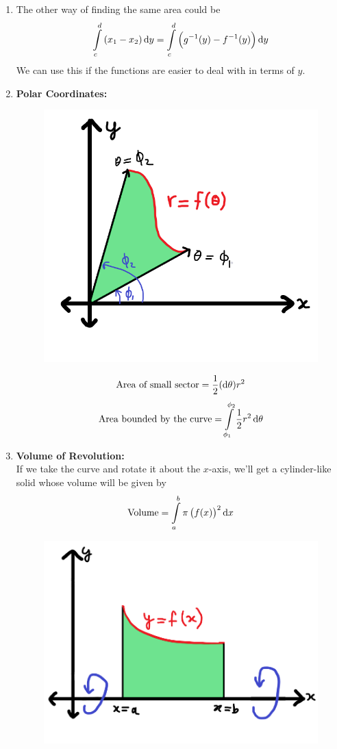 \documentclass[14]{article}
\theoremstyle{definition}
\theoremstyle{case}
\begin{document}
\begin{enumerate}
\begin{figure}[h]
\end{figure}
\item The other way of finding the same area could be
\[\int\limits_c^d \left( x_1 - x_2 \right) \dif y = \int\limits_c^d \left( g^{-1}(y) - f^{-1}(y) \right) \dif y\]
We can use this if the functions are easier to deal with in terms of $y$.
\item \textbf{Polar Coordinates:}\\
\begin{figure}[h]\centering
\includegraphics[scale=.4]{images/int_areas_polar}
\end{figure}
\[\text{Area of small sector} = \dfrac12 (\dif \theta) r^2\]
\[\text{Area bounded by the curve} = \int\limits_{\phi_1}^{\phi_2} \dfrac12 r^2 \dif \theta\]
\item \textbf{Volume of Revolution:}\\
If we take the curve and rotate it about the $x$-axis, we'll get a cylinder-like solid whose volume will be given by
\[\text{Volume} = \int\limits_a^b \pi \left( f(x) \right)^2 
\dif x\]
\nopagebreak
\begin{figure}[h]\centering
\includegraphics[scale=.31]{images/int_areas_revolution}

\end{figure}
\end{enumerate}
\end{document}
